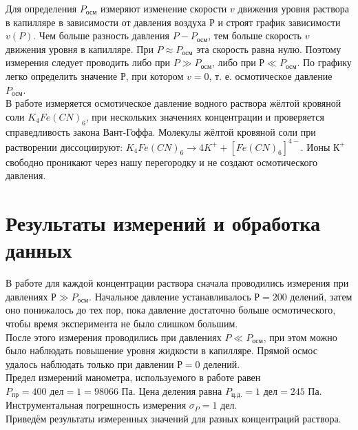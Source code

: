 \documentclass[a4paper, 12pt]{article}
\begin{document}
    \noindent Для определения $P_\text{осм}$ измеряют изменение скорости $v$ движения уровня раствора в капилляре в зависимости от давления воздуха $Р$ и строят график зависимости $v(P)$. Чем больше разность давления $P - P_\text{осм}$, тем больше скорость $v$ движения уровня в капилляре. При $P \approx P_\text{осм}$ эта скорость равна нулю. Поэтому измерения следует проводить либо при $P \gg P_\text{осм}$, либо при $Р \ll P_\text{осм}$. По графику легко определить значение Р, при котором $v = 0$, т. е. осмотическое давление $P_\text{осм}$.\\
    
    \noindent В работе измеряется осмотическое давление водного раствора жёлтой кровяной соли $K_4 Fe (CN)_6$, при нескольких значениях концентрации и проверяется справедливость закона Вант-Гоффа. Молекулы жёлтой кровяной соли при растворении диссоциируют: $K_4 Fe (CN)_6 \rightarrow 4K^{+} +[Fe (CN)_6]^{4-}$. Ионы $К^+$ свободно проникают через нашу перегородку и не создают осмотического давления.

    \section{Результаты измерений и обработка данных}

    \noindent В работе для каждой концентрации раствора сначала проводились измерения при давлениях $Р \gg P_\text{осм}$. Начальное давление устанавливалось $Р = 200$ делений, затем оно понижалось до тех пор, пока давление достаточно больше осмотического, чтобы время эксперимента не было слишком большим. \\
    
    \noindent После этого измерения проводились при давлениях $P \ll P_\text{осм}$, при этом можно было наблюдать повышение уровня жидкости в капилляре. Прямой осмос удалось наблюдать только при давлении $Р = 0$ делений. \\
    
    \noindent Предел измерений манометра, используемого в работе равен $P_\text{пр} = 400 \text{ дел} = 1 = 98066 \text{ Па}$. Цена деления равна $P_\text{ц.д.} = 1 \text{ дел} = 245 \text{ Па}$. Инструментальная погрешность измерения $\sigma_P = 1 \text{ дел}$. \\

    \noindent Приведём результаты измеренных значений для разных концентраций раствора.
\end{document}
